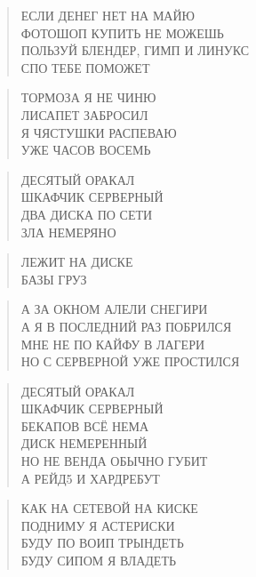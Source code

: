\poemtitle{***}
\begin{verse}
ЕСЛИ ДЕНЕГ НЕТ НА МАЙЮ\\
ФОТОШОП КУПИТЬ НЕ МОЖЕШЬ\\
ПОЛЬЗУЙ БЛЕНДЕР, ГИМП И ЛИНУКС\\
СПО ТЕБЕ ПОМОЖЕТ
\end{verse}

\poemtitle{***}
\begin{verse}
ТОРМОЗА Я НЕ ЧИНЮ\\
ЛИСАПЕТ ЗАБРОСИЛ\\
Я ЧЯСТУШКИ РАСПЕВАЮ\\
УЖЕ ЧАСОВ ВОСЕМЬ
\end{verse}

\poemtitle{***}
\begin{verse}
ДЕСЯТЫЙ ОРАКАЛ \\
ШКАФЧИК СЕРВЕРНЫЙ\\
ДВА ДИСКА ПО СЕТИ\\
ЗЛА НЕМЕРЯНО
\end{verse}

\poemtitle{***}
\begin{verse}
ЛЕЖИТ НА ДИСКЕ\\
БАЗЫ ГРУЗ
\end{verse}

\poemtitle{***}
\begin{verse}
А ЗА ОКНОМ АЛЕЛИ СНЕГИРИ\\
А Я В ПОСЛЕДНИЙ РАЗ ПОБРИЛСЯ\\
МНЕ НЕ ПО КАЙФУ В ЛАГЕРИ\\
НО С СЕРВЕРНОЙ УЖЕ ПРОСТИЛСЯ
\end{verse}

\poemtitle{***}
\begin{verse}
ДЕСЯТЫЙ ОРАКАЛ\\
ШКАФЧИК СЕРВЕРНЫЙ\\
БЕКАПОВ ВСЁ НЕМА\\
ДИСК НЕМЕРЕННЫЙ\\
НО НЕ ВЕНДА ОБЫЧНО ГУБИТ\\
А РЕЙД5 И ХАРДРЕБУТ
\end{verse}

\poemtitle{***}
\begin{verse}
КАК НА СЕТЕВОЙ НА КИСКЕ\\
ПОДНИМУ Я АСТЕРИСКИ\\
БУДУ ПО ВОИП ТРЫНДЕТЬ\\
БУДУ СИПОМ Я ВЛАДЕТЬ
\end{verse}

